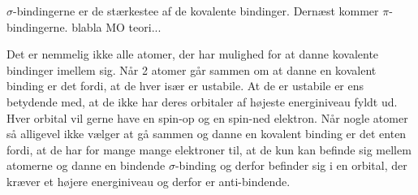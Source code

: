 $\sigma$-bindingerne er de stærkestee af de kovalente bindinger. Dernæst kommer $\pi$-bindingerne. blabla MO teori...


Det er nemmelig ikke alle atomer, der har mulighed for at danne kovalente bindinger imellem sig. Når 2 atomer går sammen om at danne en kovalent binding er det fordi, at de hver især er ustabile. At de er ustabile er ens betydende med, at de ikke har deres orbitaler af højeste energiniveau fyldt ud. Hver orbital vil gerne have en spin-op og en spin-ned elektron. Når nogle atomer så alligevel ikke vælger at gå sammen og danne en kovalent binding er det enten fordi, at de har for mange mange elektroner til, at de kun kan befinde sig mellem atomerne og danne en bindende $\sigma$-binding og derfor befinder sig i en orbital, der kræver et højere energiniveau og derfor er anti-bindende. 


